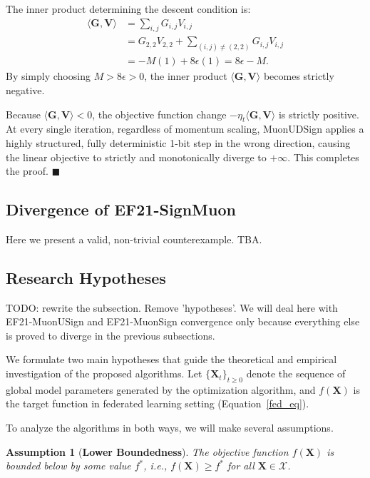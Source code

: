 \documentclass[letterpaper]{article} %
\newtheorem{assumption}{Assumption}
\begin{document}
The inner product determining the descent condition is:
\begin{align}
\langle \mathbf{G}, \mathbf{V} \rangle &= \sum_{i,j} G_{i,j} V_{i,j} \\
&= G_{2,2} V_{2,2} + \sum_{(i,j) \neq (2,2)} G_{i,j} V_{i,j} \\
&= -M(1) + 8 \epsilon(1) = 8\epsilon - M.
\end{align}
By simply choosing $M > 8\epsilon > 0$, the inner product $\langle \mathbf{G}, \mathbf{V} \rangle$ becomes strictly negative.

Because $\langle \mathbf{G}, \mathbf{V} \rangle < 0$, the objective function change $-\eta_t \langle \mathbf{G}, \mathbf{V} \rangle$ is strictly positive. At every single iteration, regardless of momentum scaling, MuonUDSign applies a highly structured, fully deterministic 1-bit step in the wrong direction, causing the linear objective to strictly and monotonically diverge to $+\infty$. This completes the proof. $\blacksquare$


\subsection{Divergence of EF21-SignMuon}\label{app:proof_th4}

Here we present a valid, non-trivial counterexample. TBA.

\subsection{Research Hypotheses}\label{app:hyp}
TODO: rewrite the subsection. Remove 'hypotheses'. We will deal here with EF21-MuonUSign and EF21-MuonSign convergence only because everything else is proved to diverge in the previous subsections.

We formulate two main hypotheses that guide the theoretical and empirical investigation of the proposed algorithms. Let $\{\mathbf{X}_t\}_{t\ge 0}$ denote the sequence of global model parameters generated by the optimization algorithm, and $f(\mathbf{X})$ is the target function in federated learning setting (Equation~\ref{fed_eq}).

To analyze the algorithms in both ways, we will make several assumptions.
\begin{assumption}[\textbf{Lower Boundedness}]\label{as:1}
The objective function $f(\mathbf{X})$ is bounded below by some value $f^*$, i.e., $f(\mathbf{X}) \ge f^*$ for all $\mathbf{X} \in \mathcal{X}$.
\end{assumption}
\end{document}
